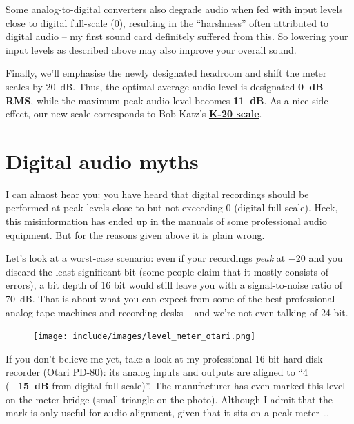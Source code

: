 Some analog-to-digital converters also degrade audio when fed with
input levels close to digital full-scale (\SI{0}{\dBFS}), resulting in
the ``harshness'' often attributed to digital audio -- my first sound
card definitely suffered from this.  So lowering your input levels as
described above may also improve your overall sound.

Finally, we'll emphasise the newly designated headroom and shift the
meter scales by \SI[addsign=all]{+20}{\dB}.  Thus, the optimal average
audio level is designated \textbf{\SI{0}{\dB} RMS}, while the maximum
peak audio level becomes \textbf{\SI[addsign=all]{+11}{\dB}}.  As a
nice side effect, our new scale corresponds to Bob Katz's
\textbf{\href{http://www.digido.com/level-practices-part-2-includes-the-k-system.html}{K-20
    scale}}.

\section{Digital audio myths}
\label{sec:digital_audio_myths}

I can almost hear you: you have heard that digital recordings should
be performed at peak levels close to but not exceeding \SI{0}{\dBFS}
(digital full-scale).  Heck, this misinformation has ended up in the
manuals of some professional audio equipment.  But for the reasons
given above it is plain wrong.

Let's look at a worst-case scenario: even if your recordings
\emph{peak} at \SI{-20}{\dBFS} and you discard the least significant
bit (some people claim that it mostly consists of errors), a bit depth
of 16 bit would still leave you with a signal-to-noise ratio of
\SI{70}{\dB}.  That is about what you can expect from some of the best
professional analog tape machines and recording desks -- and we're not
even talking of 24 bit.

\begin{figure}
\texttt{[image: include/images/level\_meter\_otari.png]}
\end{figure}

If you don't believe me yet, take a look at my professional 16-bit
hard disk recorder (Otari PD-80): its analog inputs and outputs are
aligned to ``\SI[addsign=all]{+4}{\dBu} (\textbf{\SI{-15}{\dB}} from
digital full-scale)''.  The manufacturer has even marked this level on
the meter bridge (small triangle on the photo).  Although I admit that
the mark is only useful for audio alignment, given that it sits on a
peak meter \dots

